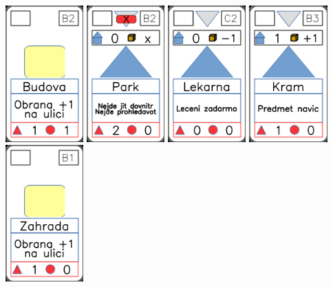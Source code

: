 \documentclass[a4paper]{article}
\begin{document}
	\includegraphics[width=3.0cm]{img-2_6}
	\includegraphics[width=3.0cm]{img-3_21}
	\includegraphics[width=3.0cm]{img-3_11}
	\includegraphics[width=3.0cm]{img-3_7}
	\includegraphics[width=3.0cm]{img-2_20}
\end{document}
